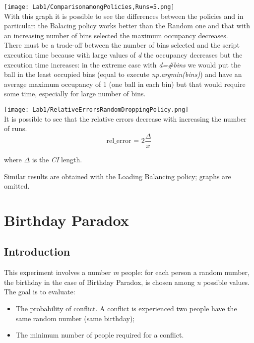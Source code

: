 \documentclass{report}
\begin{document}
{			\texttt{[image: Lab1/ComparisonamongPolicies,Runs=5.png]} \\
			With this graph it is possible to see the differences between the policies and in particular: the Balacing policy works better than the Random one and that with an increasing number of bins selected the maximum occupancy decreases. \\ There must be a trade-off between the number of bins selected and the script execution time because with large values of \emph{d} the occupancy decreases but the execution time increases: in the extreme case with \emph{d=\#bins} we would put the ball in the least occupied bins (equal to execute \emph{np.argmin(bins)}) and have an average maximum occupancy of 1 (one ball in each bin)  but that would require some time, especially for large number of bins.
			
			\texttt{[image: Lab1/RelativeErrorsRandomDroppingPolicy.png]} \\
			It is possible to see that the relative errors decrease with increasing the number of runs. 
			\begin{equation}\label{eq:3}
				 \text{rel\_error = }2\frac{\Delta}{x}
			\end{equation}
			\begin{center}
					where $\Delta$ is the \emph{CI} length.
			\end{center}
			Similar results are obtained with the Loading Balancing policy; graphs are omitted.
					
			
\chapter{Birthday Paradox}
	 
	 \section{Introduction}
	 
	This experiment involves a number \emph{m} people: for each person a random number, the birthday in the case of Birthday Paradox, is chosen among \emph{n} possible values. The goal is to evaluate:
	\begin{itemize}
		\item The probability of conflict. A conflict is experienced two people have the same random number (same birthday);
		\item The minimum number of people required for a conflict.
	\end{itemize}

}
\end{document}
